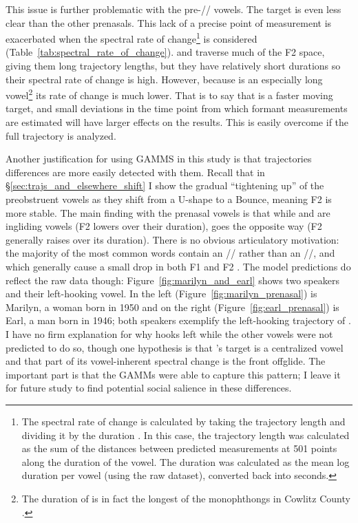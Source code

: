 This issue is further problematic with the pre-// vowels. The target is even less clear than the other prenasals. This lack of a precise point of measurement is exacerbated when the spectral rate of change\footnote{The spectral rate of change is calculated by taking the trajectory length and dividing it by the duration \citep{fox_jacewicz_2009, farrington_etal_2018}. In this case, the trajectory length was calculated as the sum of the distances between predicted measurements at 501 points along the duration of the vowel. The duration was calculated as the mean log duration per vowel (using the raw dataset), converted back into seconds.} is considered (Table~\ref{tab:spectral_rate_of_change}). \bing and \bang traverse much of the F2 space, giving them long trajectory lengths, but they have relatively short durations so their spectral rate of change is high. However, because \bat is an especially long vowel\footnote{The duration of \bat is in fact the longest of the monophthongs in Cowlitz County \citep[cf.][]{peterson_lehiste_1960}.} its rate of change is much lower. That is to say that \bang is a faster moving target, and small deviations in the time point from which formant measurements are estimated will have larger effects on the results. This is easily overcome if the full trajectory is analyzed.

Another justification for using GAMMS in this study is that trajectories differences are more easily detected with them. Recall that in \S\ref{sec:trajs_and_elsewhere_shift} I show the gradual ``tightening up'' of the preobstruent vowels as they shift from a U-shape to a Bounce, meaning F2 is more stable. The main finding with the prenasal vowels is that while \bin and \ban are ingliding vowels (F2 lowers over their duration), \ben goes the opposite way (F2 generally raises over its duration). There is no obvious articulatory motivation: the majority of the most common \ben words contain an // rather than an //, and which generally cause a small drop in both F1 and F2 \citep[143, 193]{olive_etal_1993}. The model predictions do reflect the raw data though: Figure~\ref{fig:marilyn_and_earl} shows two speakers and their left-hooking \ben vowel. In the left (Figure~\ref{fig:marilyn_prenasal}) is Marilyn, a woman born in 1950 and on the right (Figure~\ref{fig:earl_prenasal}) is Earl, a man born in 1946; both speakers exemplify the left-hooking trajectory of \ben. I have no firm explanation for why \ben hooks left while the other vowels were not predicted to do so, though one hypothesis is that \ben's target is a centralized vowel and that part of its vowel-inherent spectral change is the front offglide. The important part is that the GAMMs were able to capture this pattern; I leave it for future study to find potential social salience in these differences.

